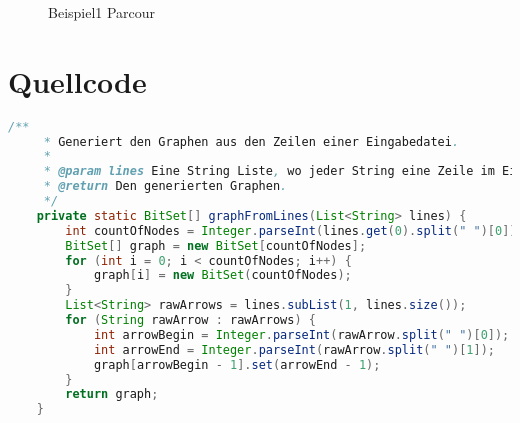 \documentclass[a4paper,10pt,ngerman]{scrartcl}
\begin{document}
    \begin{figure}[htb]
        \centering
        \caption{Beispiel1 Parcour}
        \label{fig:Figure5}
    \end{figure}


    \section{Quellcode}\label{sec:quellcode}\label{LastPage}
    \begin{lstlisting}[frame=single,language=Java,title=Methode graphFromLines,breaklines=true]
    /**
     * Generiert den Graphen aus den Zeilen einer Eingabedatei.
     *
     * @param lines Eine String Liste, wo jeder String eine Zeile im Eingabeformat ist.
     * @return Den generierten Graphen.
     */
    private static BitSet[] graphFromLines(List<String> lines) {
        int countOfNodes = Integer.parseInt(lines.get(0).split(" ")[0]);
        BitSet[] graph = new BitSet[countOfNodes];
        for (int i = 0; i < countOfNodes; i++) {
            graph[i] = new BitSet(countOfNodes);
        }
        List<String> rawArrows = lines.subList(1, lines.size());
        for (String rawArrow : rawArrows) {
            int arrowBegin = Integer.parseInt(rawArrow.split(" ")[0]);
            int arrowEnd = Integer.parseInt(rawArrow.split(" ")[1]);
            graph[arrowBegin - 1].set(arrowEnd - 1);
        }
        return graph;
    }
    \end{lstlisting}
\end{document}
